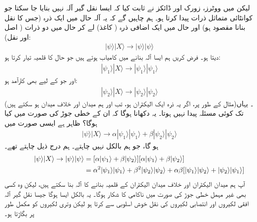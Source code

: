 لیکن میں ووٹرز، زورک اور ڈائکز نے ثابت کیا کہ ایسا نقل گیر آلہ نہیں بنایا جا سکتا جو کوانٹائی متماثل ذرات پیدا کرتا ہو۔ ہم چاہیں گے کہ یہ آلہ حال  میں ایک ذرہ (جس کا نقل بنانا مقصود ہو) اور حال  میں ایک اضافی ذرہ (  کاغذ) لے کر حال  میں دو ذرات ( اصل اور نقل):
\begin{align}
	|\psi\rangle| X\rangle\to|\psi\rangle|\psi\rangle
\end{align}
 دیتا ہو۔ فرض کریں ہم ایسا آلہ بنانے میں کامیاب ہوتے ہیں جو حال  کا قلمیہ تیار کرتا ہو: 
\begin{align}
	|\psi_1\rangle| X\rangle\to|\psi_1\rangle|\psi_1\rangle
\end{align}
اور جو  کے لیے بھی کارآمد ہو:
\begin{align}
	|\psi_2\rangle| X\rangle\to|\psi_2\rangle|\psi_2\rangle
\end{align}
(مثال کے طور پر، اگر یہ ذرہ ایک الیکٹران ہو، تب  اور  ہم میدان اور خلاف میدان ہو سکتے ہیں)۔ یہاں تک کوئی مسئلہ پیدا نہیں ہوتا۔ یہ دکھانا ہوگا کہ ان کے خطی جوڑ  کی صورت میں کیا ہوگا؟ ظاہر ہے ایسی صورت میں
\begin{align}
	|\psi\rangle| X\rangle\to\alpha|\psi_1\rangle|\psi_1\rangle+\beta|\psi_2\rangle|\psi_2\rangle
\end{align}
ہو گا، جو ہم بالکل نہیں چاہتے۔ ہم درج ذیل چاہتے تھے۔
\begin{align}
\hspace*{1cm} |\psi\rangle| X\rangle\to|\psi\rangle|\psi\rangle &= [\alpha|\psi_1\rangle+\beta|\psi_2\rangle][\alpha|\psi_1\rangle+\beta|\psi_2\rangle]\nonumber \\
	&= \alpha^2|\psi_1\rangle|\psi_1\rangle+\beta^2|\psi_2\rangle|\psi_2\rangle+\alpha\beta[|\psi_1\rangle|\psi_2\rangle+|\psi_2\rangle|\psi_1\rangle]
\end{align}
آپ ہم میدان الیکٹران اور خلاف میدان الیکٹران کے قلمیہ بنانے کا آلہ بنا سکتے ہیں، لیکن وہ کسی بھی غیر مہمل خطی جوڑ کی صورت میں ناکامی کا شکار ہوگا۔ یہ بالکل ایسا ہوگا جیسا نقل گیر آلہ افقی لکیروں اور انتصابی لکیروں کی نقل خوش اسلوبی سے کرتا ہو لیکن وتری لکیروں کو مکمل طور پر بگاڑتا ہو۔

